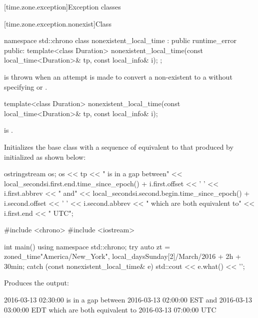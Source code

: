 [time.zone.exception]{Exception classes}

[time.zone.exception.nonexist]{Class }

\begin{codeblock}
namespace std::chrono {
  class nonexistent_local_time : public runtime_error {
  public:
    template<class Duration>
      nonexistent_local_time(const local_time<Duration>& tp, const local_info& i);
  };
}
\end{codeblock}

\pnum
{} is thrown when
an attempt is made
to convert a non-existent  to a 
without specifying  or .

%
\begin{itemdecl}
template<class Duration>
  nonexistent_local_time(const local_time<Duration>& tp, const local_info& i);
\end{itemdecl}

\begin{itemdescr}
\pnum
\expects
{} is .

\pnum
\effects
Initializes the base class with a sequence of 
equivalent to that produced by 
initialized as shown below:

\begin{codeblock}
ostringstream os;
os << tp << " is in a gap between\n"
   << local_seconds{i.first.end.time_since_epoch()} + i.first.offset << ' '
   << i.first.abbrev << " and\n"
   << local_seconds{i.second.begin.time_since_epoch()} + i.second.offset << ' '
   << i.second.abbrev
   << " which are both equivalent to\n"
   << i.first.end << " UTC";
\end{codeblock}

\pnum
\begin{example}
\begin{codeblock}
#include <chrono>
#include <iostream>

int main() {
  using namespace std::chrono;
  try {
    auto zt = zoned_time{"America/New_York",
                         local_days{Sunday[2]/March/2016} + 2h + 30min};
  } catch (const nonexistent_local_time& e) {
    std::cout << e.what() << '\n';
  }
}
\end{codeblock}

Produces the output:

\begin{outputblock}
2016-03-13 02:30:00 is in a gap between
2016-03-13 02:00:00 EST and
2016-03-13 03:00:00 EDT which are both equivalent to
2016-03-13 07:00:00 UTC
\end{outputblock}
\end{example}
\end{itemdescr}

